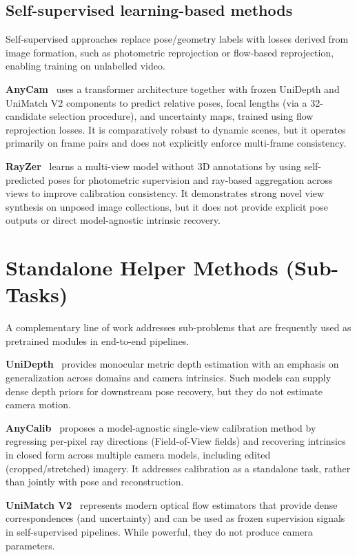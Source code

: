 \subsection{Self-supervised learning-based methods}
\label{sec:rw_selfsupervised}
Self-supervised approaches replace pose/geometry labels with losses derived from image formation, such as photometric reprojection or flow-based reprojection, enabling training on unlabelled video.

\textbf{AnyCam}~\parencite{wimbauer2025anycam} uses a transformer architecture together with frozen UniDepth and UniMatch V2 components to predict relative poses, focal lengths (via a 32-candidate selection procedure), and uncertainty maps, trained using flow reprojection losses. It is comparatively robust to dynamic scenes, but it operates primarily on frame pairs and does not explicitly enforce multi-frame consistency.

\textbf{RayZer}~\parencite{jiang2025rayzer} learns a multi-view model without 3D annotations by using self-predicted poses for photometric supervision and ray-based aggregation across views to improve calibration consistency. It demonstrates strong novel view synthesis on unposed image collections, but it does not provide explicit pose outputs or direct model-agnostic intrinsic recovery.

\section{Standalone Helper Methods (Sub-Tasks)}
\label{sec:rw_helpers}

A complementary line of work addresses sub-problems that are frequently used as pretrained modules in end-to-end pipelines.

\textbf{UniDepth}~\parencite{piccinelli2024unidepth} provides monocular metric depth estimation with an emphasis on generalization across domains and camera intrinsics. Such models can supply dense depth priors for downstream pose recovery, but they do not estimate camera motion.

\textbf{AnyCalib}~\parencite{tirado2025anycalib} proposes a model-agnostic single-view calibration method by regressing per-pixel ray directions (Field-of-View fields) and recovering intrinsics in closed form across multiple camera models, including edited (cropped/stretched) imagery. It addresses calibration as a standalone task, rather than jointly with pose and reconstruction.

\textbf{UniMatch V2}~\parencite{yang2025unimatch} represents modern optical flow estimators that provide dense correspondences (and uncertainty) and can be used as frozen supervision signals in self-supervised pipelines. While powerful, they do not produce camera parameters.

